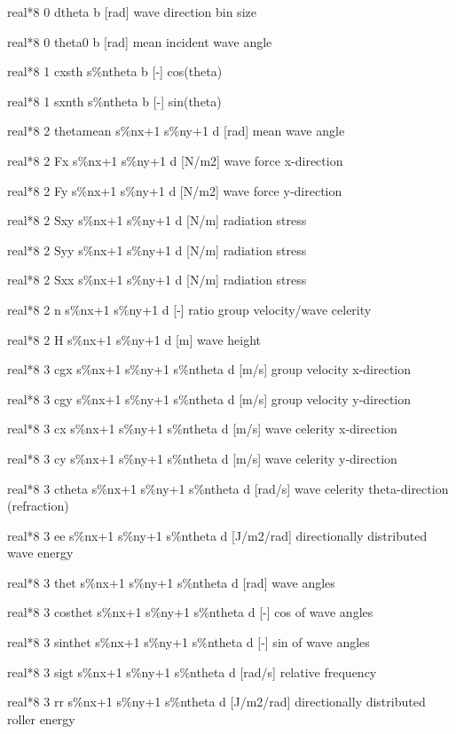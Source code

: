 real*8  0  dtheta b  [rad]      wave direction bin size

real*8  0  theta0 b  [rad]      mean incident wave angle

real*8  1  cxsth  s\%ntheta b  [-]        cos(theta)

real*8  1  sxnth  s\%ntheta b  [-]        sin(theta)

real*8  2  thetamean s\%nx+1 s\%ny+1 d  [rad]      mean wave angle

real*8  2  Fx     s\%nx+1 s\%ny+1 d  [N/m2]     wave force x-direction

real*8  2  Fy     s\%nx+1 s\%ny+1 d  [N/m2]     wave force y-direction

real*8  2  Sxy    s\%nx+1 s\%ny+1 d  [N/m]      radiation stress

real*8  2  Syy    s\%nx+1 s\%ny+1 d  [N/m]      radiation stress

real*8  2  Sxx    s\%nx+1 s\%ny+1 d  [N/m]      radiation stress

real*8  2  n      s\%nx+1 s\%ny+1 d  [-]        ratio group velocity/wave celerity

real*8  2  H      s\%nx+1 s\%ny+1 d  [m]        wave height 

real*8  3  cgx    s\%nx+1 s\%ny+1 s\%ntheta d  [m/s]      group velocity x-direction

real*8  3  cgy    s\%nx+1 s\%ny+1 s\%ntheta d  [m/s]      group velocity y-direction

real*8  3  cx     s\%nx+1 s\%ny+1 s\%ntheta d  [m/s]      wave celerity x-direction

real*8  3  cy     s\%nx+1 s\%ny+1 s\%ntheta d  [m/s]      wave celerity y-direction

real*8  3  ctheta s\%nx+1 s\%ny+1 s\%ntheta d  [rad/s]    wave celerity theta-direction (refraction)

real*8  3  ee     s\%nx+1 s\%ny+1 s\%ntheta d  [J/m2/rad] directionally distributed wave energy

real*8  3  thet   s\%nx+1 s\%ny+1 s\%ntheta d  [rad]      wave angles  

real*8  3  costhet s\%nx+1 s\%ny+1 s\%ntheta d   [-]        cos of wave angles  

real*8  3  sinthet s\%nx+1 s\%ny+1 s\%ntheta d  [-]        sin of wave angles  

real*8  3  sigt   s\%nx+1 s\%ny+1 s\%ntheta d  [rad/s]    relative frequency 

real*8  3  rr     s\%nx+1 s\%ny+1 s\%ntheta d  [J/m2/rad] directionally distributed roller energy

